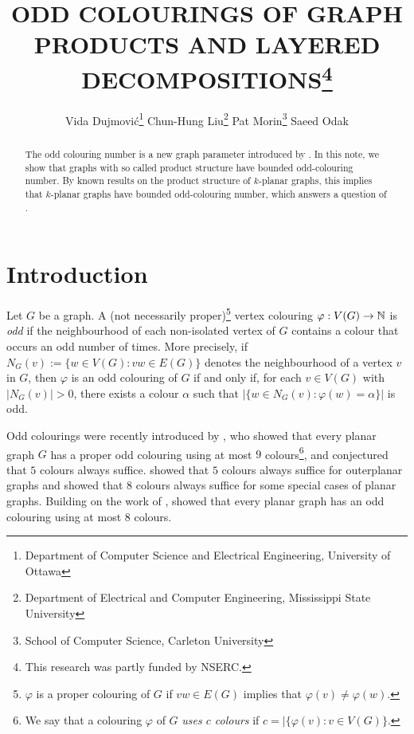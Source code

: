 \documentclass{patmorin}
\title{\MakeUppercase{Odd Colourings of Graph Products and Layered Decompositions}\thanks{This research was partly funded by NSERC.}}
\author{%
  Vida Dujmović\thanks{Department of Computer Science and Electrical Engineering, University of Ottawa}\qquad
  Chun-Hung Liu\thanks{Department of Electrical and Computer Engineering, Mississippi State University}\qquad
  Pat Morin\thanks{School of Computer Science, Carleton University}\qquad
  Saeed Odak\footnotemark[2]
}
\date{}
\begin{document}
\maketitle

\begin{abstract}
  The odd colouring number is a new graph parameter introduced by \citet{petrusevski.skrekovski:colorings}.  In this note, we show that graphs with so called product structure have bounded odd-colouring number. By known results on the product structure of $k$-planar graphs, this implies that $k$-planar graphs have bounded odd-colouring number, which answers a question of \citet{cranston.lafferty.ea:note}.
\end{abstract}

%

\section{Introduction}

Let $G$ be a graph.  A (not necessarily proper)\footnote{$\varphi$ is a proper colouring of $G$ if $vw\in E(G)$ implies that $\varphi(v)\neq\varphi(w)$.} vertex colouring $\varphi:V(G)\to\mathbb{N}$ is \emph{odd} if the neighbourhood of each non-isolated vertex of $G$ contains a colour that occurs an odd number of times.  More precisely, if $N_G(v):=\{w\in V(G):vw\in E(G)\}$ denotes the neighbourhood of a vertex $v$ in $G$, then $\varphi$ is an odd colouring of $G$ if and only if, for each $v\in V(G)$ with $|N_G(v)|>0$, there exists a colour $\alpha$ such that $|\{w\in N_G(v): \varphi(w)=\alpha\}|$ is odd.

Odd colourings were recently introduced by \citet{petrusevski.skrekovski:colorings}, who showed that every planar graph $G$ has a proper odd colouring using at most $9$ colours\footnote{We say that a colouring $\varphi$ of $G$ \emph{uses $c$ colours} if $c=|\{\varphi(v):v\in V(G)\}$.}, and conjectured that $5$ colours always suffice.  \citet{caro.petrusevski.ea:remarks} showed that $5$ colours always suffice for outerplanar graphs and showed that $8$ colours always suffice for some special cases of planar graphs.  Building on the work of \citet{caro.petrusevski.ea:remarks}, \citet{petr.portier:odd} showed that every planar graph has an odd colouring using at most $8$ colours.
\end{document}
